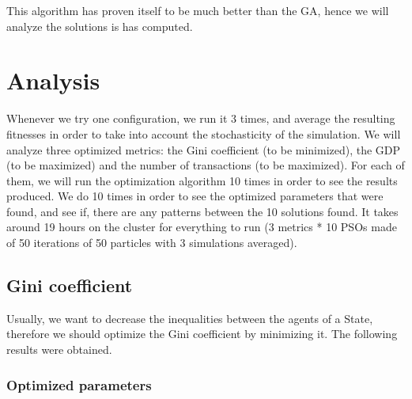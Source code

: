     This algorithm has proven itself to be much better than the GA, hence we will analyze the solutions is has computed. 

\section{Analysis}
    Whenever we try one configuration, we run it 3 times, and average the resulting fitnesses in order to take into account the stochasticity of the simulation. We will analyze three optimized metrics: the Gini coefficient (to be minimized), the GDP (to be maximized) and the number of transactions (to be maximized). For each of them, we will run the optimization algorithm 10 times in order to see the results produced. We do 10 times in order to see the optimized parameters that were found, and see if, there are any patterns between the 10 solutions found. It takes around 19 hours on the cluster for everything to run (3 metrics * 10 PSOs made of 50 iterations of 50 particles with 3 simulations averaged).

    \subsection{Gini coefficient}

        Usually, we want to decrease the inequalities between the agents of a State, therefore we should optimize the Gini coefficient by minimizing it. The following results were obtained.
    
        \subsubsection{Optimized parameters}

